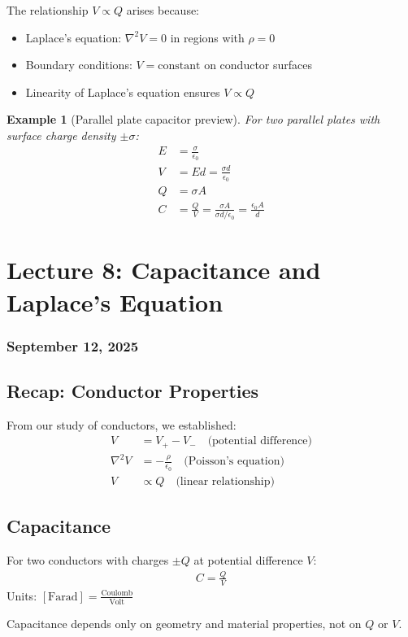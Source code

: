 \documentclass{article}
\newtheorem{example}[theorem]{Example}
\begin{document}
The relationship $V \propto Q$ arises because:
\begin{itemize}
    \item Laplace's equation: $\nabla^2 V = 0$ in regions with $\rho = 0$
    \item Boundary conditions: $V = \text{constant}$ on conductor surfaces
    \item Linearity of Laplace's equation ensures $V \propto Q$
\end{itemize}

\begin{example}[Parallel plate capacitor preview]
For two parallel plates with surface charge density $\pm\sigma$:
\begin{align*}
    E &= \frac{\sigma}{\epsilon_0} \\
    V &= Ed = \frac{\sigma d}{\epsilon_0} \\
    Q &= \sigma A \\
    C &= \frac{Q}{V} = \frac{\sigma A}{\sigma d/\epsilon_0} = \frac{\epsilon_0 A}{d}
\end{align*}
\end{example}


\newpage
\section{Lecture 8: Capacitance and Laplace's Equation}
\subsubsection*{September 12, 2025}

\subsection{Recap: Conductor Properties}
From our study of conductors, we established:
\begin{align*}
    V &= V_+ - V_- \quad \text{(potential difference)} \\
    \nabla^2 V &= -\frac{\rho}{\epsilon_0} \quad \text{(Poisson's equation)} \\
    V &\propto Q \quad \text{(linear relationship)}
\end{align*}

\subsection{Capacitance}
\begin{conceptbox}
For two conductors with charges $\pm Q$ at potential difference $V$:
\begin{align*}
    C = \frac{Q}{V}
\end{align*}
Units: $[\text{Farad}] = \frac{\text{Coulomb}}{\text{Volt}}$

Capacitance depends only on geometry and material properties, not on $Q$ or $V$.
\end{conceptbox}
\end{document}
